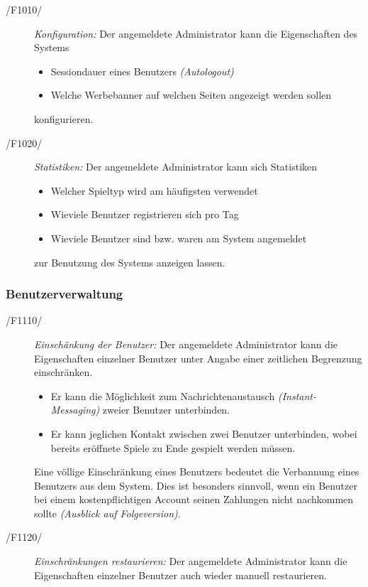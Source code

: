 \begin{description}
  \item[/F1010/]
    \textit{Konfiguration:}
    Der angemeldete Administrator kann die Eigenschaften des Systems
    \begin{itemize}
      \item Sessiondauer eines Benutzers \textit{(Autologout)}
      \item Welche Werbebanner auf welchen Seiten angezeigt werden sollen
    \end{itemize}
    konfigurieren.
  \item[/F1020/]
    \textit{Statistiken:}
    Der angemeldete Administrator kann sich Statistiken
    \begin{itemize}
      \item Welcher Spieltyp wird am häufigsten verwendet
      \item Wieviele Benutzer registrieren sich pro Tag
      \item Wieviele Benutzer sind bzw. waren am System angemeldet
    \end{itemize}
    zur Benutzung des Systems anzeigen lassen.
\end{description}

\subsubsection{Benutzerverwaltung}

\begin{description}
  \item[/F1110/]
    \textit{Einschänkung der Benutzer:}
    Der angemeldete Administrator kann die Eigenschaften einzelner Benutzer unter Angabe einer zeitlichen Begrenzung einschränken.
    \begin{itemize}
      \item Er kann die Möglichkeit zum Nachrichtenaustausch \textit{(Instant-Messaging)} zweier Benutzer unterbinden.
      \item Er kann jeglichen Kontakt zwischen zwei Benutzer unterbinden, wobei bereits eröffnete Spiele zu Ende gespielt werden müssen.
    \end{itemize}
    Eine völlige Einschränkung eines Benutzers bedeutet die Verbannung eines Benutzers aus dem System.
    Dies ist besonders sinnvoll, wenn ein Benutzer bei einem kostenpflichtigen Account seinen Zahlungen nicht nachkommen sollte
    \textit{(Ausblick auf Folgeversion)}.
  \item[/F1120/]
    \textit{Einschränkungen restaurieren:}
    Der angemeldete Administrator kann die Eigenschaften einzelner Benutzer auch wieder manuell restaurieren.
\end{description}
